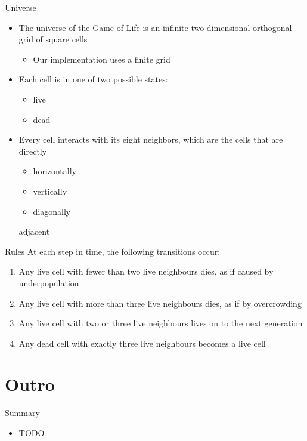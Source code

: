 \begin{frame}{Universe}
  \begin{itemize}
  \item The universe of the Game of Life is an infinite
    two-dimensional orthogonal grid of square cells
    \begin{itemize}
    \item Our implementation uses a finite grid
    \end{itemize}
  \item Each cell is in one of two possible states:
    \begin{itemize}
    \item live
    \item dead
    \end{itemize}
  \item Every cell interacts with its eight neighbors, which are the
    cells that are directly
    \begin{itemize}
    \item horizontally
    \item vertically
    \item diagonally
    \end{itemize}
    adjacent
  \end{itemize}
\end{frame}

\begin{frame}{Rules}
  At each step in time, the following transitions occur:


  \begin{enumerate}
  \item Any live cell with fewer than two live neighbours dies, as if
    caused by underpopulation
  \item Any live cell with more than three live neighbours dies, as if
    by overcrowding
  \item Any live cell with two or three live neighbours lives on to
    the next generation
  \item Any dead cell with exactly three live neighbours becomes a
    live cell
  \end{enumerate}  
\end{frame}


\section*{Outro}

\begin{frame}{Summary}
  \begin{itemize}
  \item TODO
  \end{itemize}
\end{frame}


